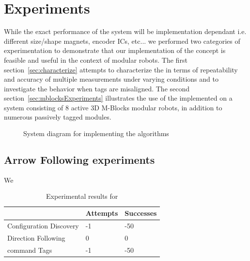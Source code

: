 \section{Experiments}
\label{sec:Experiments}
While the exact performance of the \tagName system will be implementation dependant i.e. different size/shape magnets, encoder ICs, etc... we performed two categories of experimentation to demonstrate that our implementation of the \tagName concept is feasible and useful in the context of modular robots. The first section~\ref{sec:characterize} attempts to characterize the \tagNamePlural in terms of repeatability and accuracy of multiple measurements under varying conditions and to investigate the behavior when tags are misaligned. The second section~\ref{sec:mblocksExperiments} illustrates the use of the \tagNamePlural implemented on a system consisting of 8 active 3D M-Blocks modular robots, in addition to numerous passively tagged modules.

\begin{figure}[ht]

	
	
	
	\caption{System diagram for implementing the algorithms}
	
	\label{fig:PlaneChanging2}
\end{figure}



\subsection{Arrow Following experiments}
\label{sec:mblocksExperimentsArrow}
We 

\begin{table}[h]
	\caption{Experimental results for }
	
	\begin{tabular}{ p{3.4cm}  p{1.9cm}  p{1.9cm} }
		\hline
								& Attempts 	& Successes \\
		\hline
		Configuration Discovery	&  -1 		& -50 \\
		Direction Following		& 0 		& 0  \\
		command Tags 			&  -1 		& -50 \\		
	\end{tabular}
	
	\label{tab:info}
\end{table}


